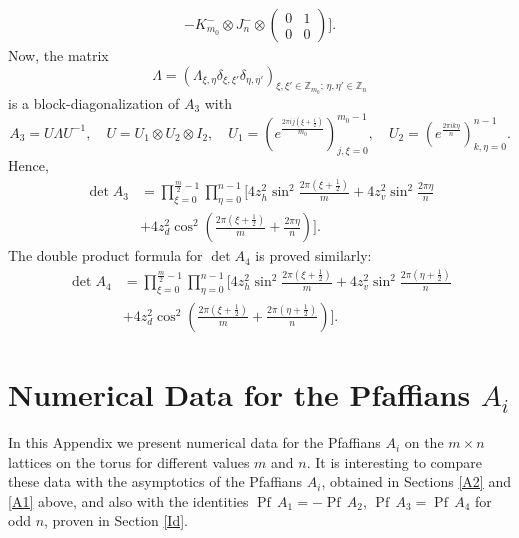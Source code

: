 \documentclass[12pt,reqno]{amsart}
\numberwithin{equation}{section}
\newcommand{\Z}{{\mathbb Z}}
\newcommand{\La}{\Lambda}
\newcommand{\de}{\delta}
\newcommand{\Pf}{{\operatorname{Pf}\,}}
\begin{document}
\begin{appendix}
\begin{equation}
\begin{aligned}
-K_{m_0}^-\otimes J_n^-\otimes \begin{pmatrix}
0 & 1 \\
0 & 0
\end{pmatrix}
\bigg].
\end{aligned}
\end{equation}
Now, the matrix 
\begin{equation}\label{k12b}
\La=\left(\La_{\xi,\eta}\de_{\xi,\xi'}\de_{\eta,\eta'}\right)_{\xi,\xi'\in \Z_{m_0};\, \eta,\eta'\in\Z_n}
\end{equation}
is a  block-diagonalization of $A_3$ with
\begin{equation}\label{k13a1}
A_3=U\La U^{-1}, \quad U=U_1\otimes U_2\otimes I_2,\quad U_1=\left( e^{\frac{2\pi i j\left(\xi+\frac{1}{2}\right)}{m_{0}}}\right)_{j,\xi=0}^{m_0-1},\quad
U_2=\left( e^{\frac{2\pi ik\eta}{n} }\right)_{k,\eta=0}^{n-1}.
\end{equation}
Hence,
\begin{equation}\label{k3m3}
\begin{aligned}
\det A_3&=\prod_{\xi=0}^{\frac{m}{2}-1}\prod_{\eta=0}^{n-1}\Bigg[4z_h^2 \sin^2\frac{2\pi \left(\xi+\frac{1}{2}\right)}{m}
+4z_v^2 \sin^2\frac{2\pi \eta}{n}\\
&+4z_d^2\cos^2\left(\frac{2\pi \left(\xi+\frac{1}{2}\right)}{m}+\frac{2\pi \eta}{n}\right)\Bigg].
\end{aligned}
\end{equation}
The double product formula for $\det A_4$ is proved similarly:
\begin{equation}\label{k3m4}
\begin{aligned}
\det A_4&=\prod_{\xi=0}^{\frac{m}{2}-1}\prod_{\eta=0}^{n-1}\Bigg[4z_h^2 \sin^2\frac{2\pi \left(\xi+\frac{1}{2}\right)}{m}
+4z_v^2 \sin^2\frac{2\pi \left(\eta+\frac{1}{2}\right)}{n}\\
&+4z_d^2\cos^2\left(\frac{2\pi \left(\xi+\frac{1}{2}\right)}{m}+\frac{2\pi \left(\eta+\frac{1}{2}\right)}{n}\right)\Bigg].
\end{aligned}
\end{equation}




\section{Numerical Data for the Pfaffians $A_i$}\label{numerics}

In this Appendix we present numerical data for the Pfaffians $A_i$ on the $m\times n$ lattices on the torus for different values $m$ and $n$. It is interesting to compare these data with the asymptotics of the Pfaffians $A_i$, obtained in Sections \ref{A2} and \ref{A1} above, and also with the identities $\Pf A_1=-\Pf A_2$, $\Pf A_3=\Pf A_4$ for odd $n$, proven in Section \ref{Id}. 


\end{appendix}
\end{document}
